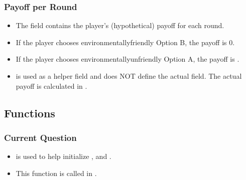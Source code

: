 \documentclass[letterpaper,10pt,english]{sphinxmanual}
\begin{document}
\subsubsection{Payoff per Round}
\label{\detokenize{Player_fields:payoff-per-round}}\begin{itemize}
\item {} 
The  field contains the player’s (hypothetical) payoff for each round.

\item {} 
If the player chooses environmentally\sphinxhyphen{}friendly Option B, the payoff is 0.

\item {} 
If the player chooses environmentally\sphinxhyphen{}unfriendly Option A, the payoff is .

\item {} 
 is used as a helper field and does NOT define the actual  field.
The actual payoff is calculated in {\hyperref[\detokenize{Player_fields:set-payoff-ref}]{}}.

\end{itemize}


\subsection{Functions}
\label{\detokenize{Player_fields:functions}}

\subsubsection{Current Question}
\label{\detokenize{Player_fields:current-question}}\begin{itemize}
\item {} 
 is used to help initialize ,  and .

\item {} 
This function is called in {\hyperref[\detokenize{Subsession_fields:creating-session-ref}]{}}.

\end{itemize}
\end{document}
